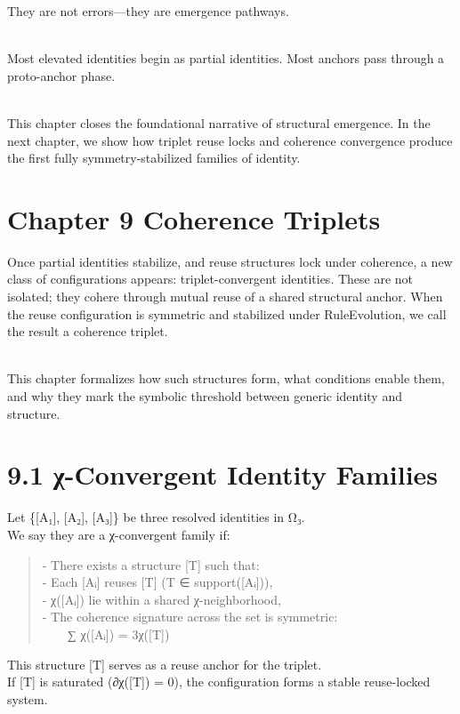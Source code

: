 They are not errors---they are emergence pathways.\\
\strut \\
Most elevated identities begin as partial identities. Most anchors pass
through a proto-anchor phase.\\
\strut \\
This chapter closes the foundational narrative of structural emergence.
In the next chapter, we show how triplet reuse locks and coherence
convergence produce the first fully symmetry-stabilized families of
identity.

\section{Chapter 9 \textbar{} Coherence
Triplets}\label{chapter-9-coherence-triplets}

Once partial identities stabilize, and reuse structures lock under
coherence, a new class of configurations appears: triplet-convergent
identities. These are not isolated; they cohere through mutual reuse of
a shared structural anchor. When the reuse configuration is symmetric
and stabilized under RuleEvolution, we call the result a coherence
triplet.\\
\strut \\
This chapter formalizes how such structures form, what conditions enable
them, and why they mark the symbolic threshold between generic identity
and structure.

\section{9.1 \textbar{} χ-Convergent Identity
Families}\label{ux3c7-convergent-identity-families}

Let \{{[}A₁{]}, {[}A₂{]}, {[}A₃{]}\} be three resolved identities in
Ω₃.\\
We say they are a χ-convergent family if:

\begin{quote}
- There exists a structure {[}T{]} such that:\\
- Each {[}Aᵢ{]} reuses {[}T{]} (T ∈ support({[}Aᵢ{]})),\\
- χ({[}Aᵢ{]}) lie within a shared χ-neighborhood,\\
- The coherence signature across the set is symmetric:\\
  ∑ χ({[}Aᵢ{]}) = 3χ({[}T{]})
\end{quote}

This structure {[}T{]} serves as a reuse anchor for the triplet.\\
If {[}T{]} is saturated (∂χ({[}T{]}) = 0), the configuration forms a
stable reuse-locked system.

